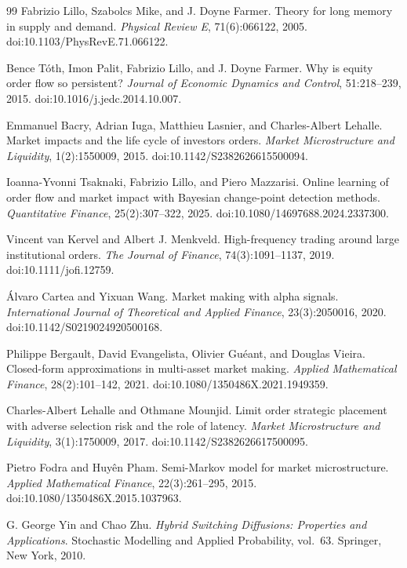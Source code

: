 \documentclass[11pt,a4paper]{article}
\theoremstyle{plain}
\theoremstyle{definition}
\begin{document}
\begin{thebibliography}{99}
Fabrizio Lillo, Szabolcs Mike, and J. Doyne Farmer.
Theory for long memory in supply and demand.
\emph{Physical Review E}, 71(6):066122, 2005.
doi:10.1103/PhysRevE.71.066122.

Bence T\'oth, Imon Palit, Fabrizio Lillo, and J. Doyne Farmer.
Why is equity order flow so persistent?
\emph{Journal of Economic Dynamics and Control}, 51:218--239, 2015.
doi:10.1016/j.jedc.2014.10.007.

Emmanuel Bacry, Adrian Iuga, Matthieu Lasnier, and Charles-Albert Lehalle.
Market impacts and the life cycle of investors orders.
\emph{Market Microstructure and Liquidity}, 1(2):1550009, 2015.
doi:10.1142/S2382626615500094.

Ioanna-Yvonni Tsaknaki, Fabrizio Lillo, and Piero Mazzarisi.
Online learning of order flow and market impact with Bayesian change-point
detection methods.
\emph{Quantitative Finance}, 25(2):307--322, 2025.
doi:10.1080/14697688.2024.2337300.

Vincent van Kervel and Albert J. Menkveld.
High-frequency trading around large institutional orders.
\emph{The Journal of Finance}, 74(3):1091--1137, 2019.
doi:10.1111/jofi.12759.

\'Alvaro Cartea and Yixuan Wang.
Market making with alpha signals.
\emph{International Journal of Theoretical and Applied Finance},
23(3):2050016, 2020.
doi:10.1142/S0219024920500168.

Philippe Bergault, David Evangelista, Olivier Gu\'eant, and Douglas Vieira.
Closed-form approximations in multi-asset market making.
\emph{Applied Mathematical Finance}, 28(2):101--142, 2021.
doi:10.1080/1350486X.2021.1949359.

Charles-Albert Lehalle and Othmane Mounjid.
Limit order strategic placement with adverse selection risk and the role of
latency.
\emph{Market Microstructure and Liquidity}, 3(1):1750009, 2017.
doi:10.1142/S2382626617500095.

Pietro Fodra and Huy\^en Pham.
Semi-Markov model for market microstructure.
\emph{Applied Mathematical Finance}, 22(3):261--295, 2015.
doi:10.1080/1350486X.2015.1037963.

G. George Yin and Chao Zhu.
\emph{Hybrid Switching Diffusions: Properties and Applications}.
Stochastic Modelling and Applied Probability, vol.~63. Springer, New York, 2010.

\end{thebibliography}
\endgroup
\end{document}

